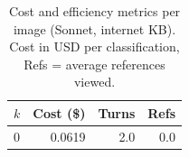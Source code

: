 \begin{table}[t]
\centering
\small
\caption{Cost and efficiency metrics per image (Sonnet, internet KB). Cost in USD per classification, Refs = average references viewed.}
\label{tab:wheat_cost}
\begin{tabular}{lrrr}
\toprule
$k$ & Cost (\$) & Turns & Refs \\
\midrule
0 & 0.0619 & 2.0 & 0.0 \\
\bottomrule
\end{tabular}
\end{table}